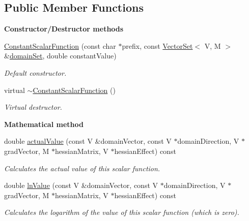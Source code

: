 \subsection*{Public Member Functions}
\begin{Indent}{\bf Constructor/\-Destructor methods}\par
\begin{DoxyCompactItemize}
\item 
\hyperlink{class_q_u_e_s_o_1_1_constant_scalar_function_a678cb62f30857415abcb1f0a18ad9a9b}{Constant\-Scalar\-Function} (const char $\ast$prefix, const \hyperlink{class_q_u_e_s_o_1_1_vector_set}{Vector\-Set}$<$ V, M $>$ \&\hyperlink{class_q_u_e_s_o_1_1_base_scalar_function_ad0937628825249dd36ded3ce0c7959ac}{domain\-Set}, double constant\-Value)
\begin{DoxyCompactList}\small\item\em Default constructor. \end{DoxyCompactList}\item 
virtual \hyperlink{class_q_u_e_s_o_1_1_constant_scalar_function_ab64b8406ba428ac948013bd5458d6410}{$\sim$\-Constant\-Scalar\-Function} ()
\begin{DoxyCompactList}\small\item\em Virtual destructor. \end{DoxyCompactList}\end{DoxyCompactItemize}
\end{Indent}
\begin{Indent}{\bf Mathematical method}\par
\begin{DoxyCompactItemize}
\item 
double \hyperlink{class_q_u_e_s_o_1_1_constant_scalar_function_a36f58555d9d88c4785297bf72fb5a9f1}{actual\-Value} (const V \&domain\-Vector, const V $\ast$domain\-Direction, V $\ast$grad\-Vector, M $\ast$hessian\-Matrix, V $\ast$hessian\-Effect) const 
\begin{DoxyCompactList}\small\item\em Calculates the actual value of this scalar function. \end{DoxyCompactList}\item 
double \hyperlink{class_q_u_e_s_o_1_1_constant_scalar_function_acf0fb2fe0c7dbe30bec6782c94e2a9e3}{ln\-Value} (const V \&domain\-Vector, const V $\ast$domain\-Direction, V $\ast$grad\-Vector, M $\ast$hessian\-Matrix, V $\ast$hessian\-Effect) const 
\begin{DoxyCompactList}\small\item\em Calculates the logarithm of the value of this scalar function (which is zero). \end{DoxyCompactList}\end{DoxyCompactItemize}
\end{Indent}

